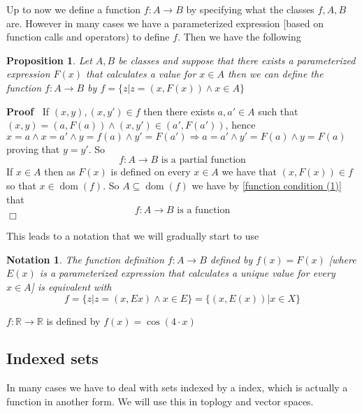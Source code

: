 \documentclass{book}
\newcommand{\tmop}[1]{\ensuremath{\operatorname{#1}}}
\newcommand{\tmtextbf}[1]{\text{{\bfseries{#1}}}}
\newenvironment{proof}{\noindent\textbf{Proof\ }}{\hspace*{\fill}$\Box$\medskip}
\newtheorem{notation}{Notation}
{\theorembodyfont{\rmfamily}\newtheorem{note}{Note}}
\newtheorem{proposition}{Proposition}
{\theorembodyfont{\rmfamily}\newtheorem{remark}{Remark}}
\begin{document}
Up to now we define a function $f : A \rightarrow B$ by specifying what the
classes $f, A, B$ are. However in many cases we have a parameterized
expression [based on function calls and operators) to define $f$. Then we have
the following

\begin{proposition}
  \label{function simple definition}Let $A, B$ be classes and suppose that
  there exists a parameterized expression $F (x)$ that calculates a
  \tmtextbf{unique} value for \tmtextbf{every} $x \in A$ then we can define
  the function $f : A \rightarrow B$ by $f = \{ z|z = (x, F (x)) \wedge x \in
  A \}$
\end{proposition}

\begin{proof}
  If $(x, y), (x, y') \in f$ then there exists $a, a' \in A$ such that $(x, y)
  = (a, F (a)) \wedge (x, y') \in (a', F (a'))$, hence $x = a \wedge x = a'
  \wedge y = f (a) \wedge y' = F (a') \Rightarrow a = a' \wedge y' = F (a)
  \wedge y = F (a)$ proving that $y = y'$. So
  \[ f : A \rightarrow B \text{ is a partial function} \]
  If $x \in A$ then as $F (x)$ is defined on every $x \in A$ we have that $(x,
  F (x)) \in f$ so that $x \in \tmop{dom} (f)$. So $A \subseteq \tmop{dom}
  (f)$ we have by \ref{function condition (1)} that
  \[ f : A \rightarrow B \text{ is a function} \]
\end{proof}

This leads to a notation that we will gradually start to use

\begin{notation}
  \label{function simple definition notation}The function definition $f : A
  \rightarrow B$ defined by $f (x) = F (x)$ [where $E (x)$ is a parameterized
  expression that calculates a unique value for every $x \in A$] is equivalent
  with
  \[ f = \{ z|z = (x, Ex) \wedge x \in E \} = \{ (x, E (x)) |x \in X \} \]
\end{notation}

\begin{example}
  $f : \mathbb{R} \rightarrow \mathbb{R}$ is defined by $f (x) = \cos (4 \cdot
  x)$
\end{example}

\subsection{Indexed sets}

In many cases we have to deal with sets indexed by a index, which is actually
a function in another form. We will use this in toplogy and vector spaces.
\end{document}
